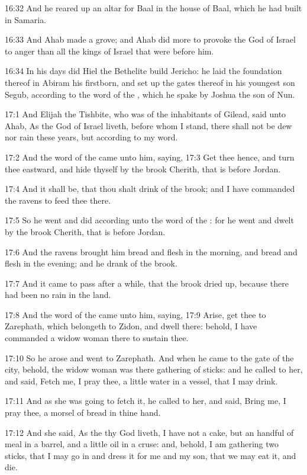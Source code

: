 16:32 And he reared up an altar for Baal in the house of Baal, which he had built in Samaria.

16:33 And Ahab made a grove; and Ahab did more to provoke the \LORD God of Israel to anger than all the kings of Israel that were before him.

16:34 In his days did Hiel the Bethelite build Jericho: he laid the foundation thereof in Abiram his firstborn, and set up the gates thereof in his youngest son Segub, according to the word of the \LORD, which he spake by Joshua the son of Nun.

17:1 And Elijah the Tishbite, who was of the inhabitants of Gilead, said unto Ahab, As the \LORD God of Israel liveth, before whom I stand, there shall not be dew nor rain these years, but according to my word.

17:2 And the word of the \LORD came unto him, saying, 17:3 Get thee hence, and turn thee eastward, and hide thyself by the brook Cherith, that is before Jordan.

17:4 And it shall be, that thou shalt drink of the brook; and I have commanded the ravens to feed thee there.

17:5 So he went and did according unto the word of the \LORD: for he went and dwelt by the brook Cherith, that is before Jordan.

17:6 And the ravens brought him bread and flesh in the morning, and bread and flesh in the evening; and he drank of the brook.

17:7 And it came to pass after a while, that the brook dried up, because there had been no rain in the land.

17:8 And the word of the \LORD came unto him, saying, 17:9 Arise, get thee to Zarephath, which belongeth to Zidon, and dwell there: behold, I have commanded a widow woman there to sustain thee.

17:10 So he arose and went to Zarephath. And when he came to the gate of the city, behold, the widow woman was there gathering of sticks: and he called to her, and said, Fetch me, I pray thee, a little water in a vessel, that I may drink.

17:11 And as she was going to fetch it, he called to her, and said, Bring me, I pray thee, a morsel of bread in thine hand.

17:12 And she said, As the \LORD thy God liveth, I have not a cake, but an handful of meal in a barrel, and a little oil in a cruse: and, behold, I am gathering two sticks, that I may go in and dress it for me and my son, that we may eat it, and die.

